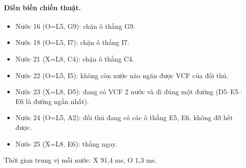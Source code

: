 \paragraph{Diễn biến chiến thuật.}
\begin{itemize}\small
\setlength{\itemsep}{0pt}
  \item Nước 16 (O=L5, G9): chặn ô thắng G9.
  \item Nước 18 (O=L5, I7): chặn ô thắng I7.
  \item Nước 21 (X=L8, C4): chặn ô thắng C4.
  \item Nước 22 (O=L5, I5): không còn nước nào ngăn được VCF của đối thủ.
  \item Nước 23 (X=L8, D5): đang có VCF 2 nước và đi đúng một đường (D5--E5--E6 là đường ngắn nhất).
  \item Nước 24 (O=L5, A2): đối thủ đang có các ô thắng E5, E6, không đỡ hết được.
  \item Nước 25 (X=L8, E6): thắng ngay.
\end{itemize}
Thời gian trung vị mỗi nước: X 91,4 ms, O 1,3 ms.
\clearpage

